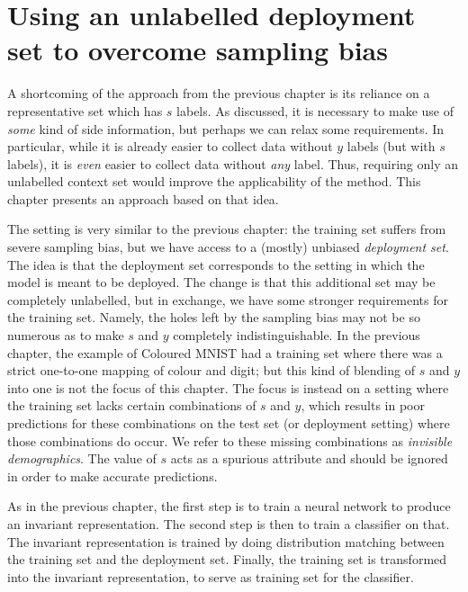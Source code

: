 \section{Using an unlabelled deployment set to overcome sampling bias}\label{sec:zsf}
A shortcoming of the approach from the previous chapter
is its reliance on a representative set which has \(s\) labels.
As discussed, it is necessary to make use of \emph{some} kind of side information,
but perhaps we can relax some requirements.
In particular, while it is already easier to collect data without \(y\) labels (but with \(s\) labels),
it is \emph{even} easier to collect data without \emph{any} label.
Thus, requiring only an unlabelled context set would improve the applicability of the method.
This chapter presents an approach based on that idea.

The setting is very similar to the previous chapter:
the training set suffers from severe sampling bias, but we have access to a (mostly) unbiased \emph{deployment set}.
The idea is that the deployment set corresponds to the setting in which the model is meant to be deployed.
The change is that this additional set may be completely unlabelled,
but in exchange, we have some stronger requirements for the training set.
Namely, the holes left by the sampling bias may not be so numerous
as to make \(s\) and \(y\) completely indistinguishable.
In the previous chapter, the example of Coloured MNIST had a training set
where there was a strict one-to-one mapping of colour and digit;
but this kind of blending of \(s\) and \(y\) into one is not the focus of this chapter.
The focus is instead on a setting where the training set lacks certain combinations of \(s\) and \(y\),
which results in poor predictions for these combinations on the test set (or deployment setting)
where those combinations do occur.
We refer to these missing combinations as \emph{invisible demographics}.
The value of \(s\) acts as a spurious attribute and should be ignored in order to make accurate predictions.

As in the previous chapter, the first step is to train a neural network to produce an invariant representation.
The second step is then to train a classifier on that.
The invariant representation is trained by doing distribution matching between the training set and the deployment set.
Finally, the training set is transformed into the invariant representation,
to serve as training set for the classifier.

